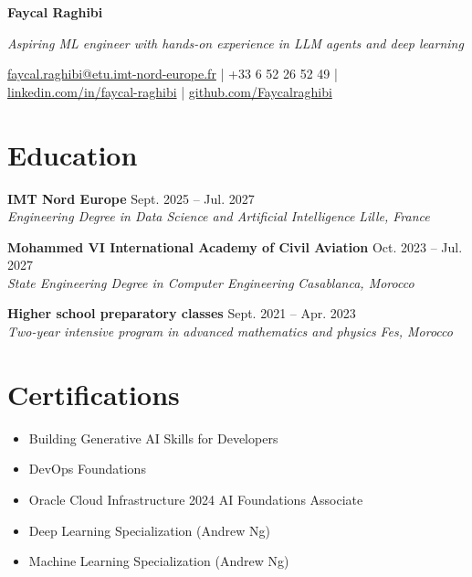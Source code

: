 \documentclass[11pt,a4paper]{article}
\newcommand{\resumeSubheading}[4]{
  \vspace{3pt}
  \noindent\textbf{#1} \hfill #2 \\
  \textit{#3} \hfill \textit{#4}
  \vspace{2pt}
}
\begin{document}
\begin{center}
{\LARGE \textbf{Faycal Raghibi}}

\vspace{2pt}
{\small\textit{Aspiring ML engineer with hands-on experience in LLM agents and deep learning}}

\vspace{2pt}
\href{mailto:faycal.raghibi@etu.imt-nord-europe.fr}{faycal.raghibi@etu.imt-nord-europe.fr} | +33 6 52 26 52 49 | \href{https://linkedin.com/in/faycal-raghibi}{linkedin.com/in/faycal-raghibi} | \href{https://github.com/Faycalraghibi}{github.com/Faycalraghibi}
\end{center}

\section{Education}
\resumeSubheading{IMT Nord Europe}{Sept. 2025 -- Jul. 2027}{Engineering Degree in Data Science and Artificial Intelligence}{Lille, France}
\resumeSubheading{Mohammed VI International Academy of Civil Aviation}{Oct. 2023 -- Jul. 2027}{State Engineering Degree in Computer Engineering}{Casablanca, Morocco}
\resumeSubheading{Higher school preparatory classes}{Sept. 2021 -- Apr. 2023}{Two-year intensive program in advanced mathematics and physics}{Fes, Morocco}

\section{Certifications}
\begin{itemize}
  \item Building Generative AI Skills for Developers
  \item DevOps Foundations
  \item Oracle Cloud Infrastructure 2024 AI Foundations Associate
  \item Deep Learning Specialization (Andrew Ng)
  \item Machine Learning Specialization (Andrew Ng)
\end{itemize}
\end{document}
